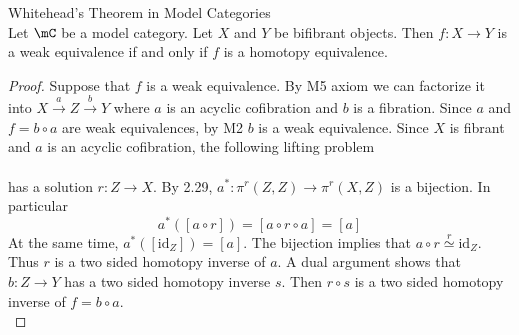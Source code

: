 \documentclass[a4paper]{article}
\begin{document}
\begin{thm}{Whitehead's Theorem in Model Categories}{}\\ Let $\mC$ be a model category. Let $X$ and $Y$ be bifibrant objects. Then $f:X\to Y$ is a weak equivalence if and only if $f$ is a homotopy equivalence. 
\begin{proof}
Suppose that $f$ is a weak equivalence. By M5 axiom we can factorize it into $X\overset{a}{\longrightarrow}Z\overset{b}{\longrightarrow}Y$ where $a$ is an acyclic cofibration and $b$ is a fibration. Since $a$ and $f=b\circ a$ are weak equivalences, by M2 $b$ is a weak equivalence. Since $X$ is fibrant and $a$ is an acyclic cofibration, the following lifting problem \\
\\ 
has a solution $r:Z\to X$. By 2.29, $a^\ast:\pi^r(Z,Z)\to\pi^r(X,Z)$ is a bijection. In particular $$a^\ast([a\circ r])=[a\circ r\circ a]=[a]$$ At the same time, $a^\ast([\text{id}_Z])=[a]$. The bijection implies that $a\circ r\overset{r}{\simeq}\text{id}_Z$. Thus $r$ is a two sided homotopy inverse of $a$. A dual argument shows that $b:Z\to Y$ has a two sided homotopy inverse $s$. Then $r\circ s$ is a two sided homotopy inverse of $f=b\circ a$. \\


\end{proof}
\end{thm}
\end{document}
